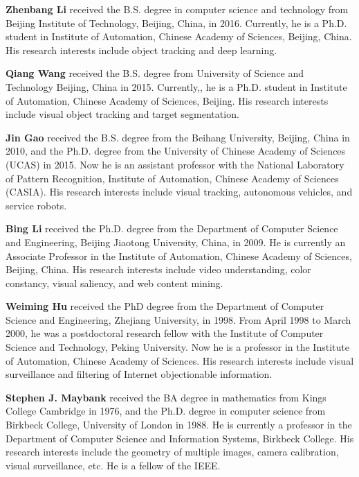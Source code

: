 \documentclass[preprint,10pt]{article}
\date{}
\begin{document}
\noindent \textbf{Zhenbang Li} received the B.S. degree in computer science and technology from Beijing Institute of Technology, Beijing, China, in 2016. Currently, he is a Ph.D. student in Institute of Automation, Chinese Academy of Sciences, Beijing, China. His research interests include object tracking and deep learning.
\vspace{6mm}

\noindent \textbf{Qiang Wang} received the B.S. degree from University of Science and Technology Beijing, China in 2015. Currently,, he is a Ph.D. student in Institute of Automation, Chinese Academy of Sciences, Beijing. His research interests include visual object tracking and target segmentation.
\vspace{6mm}

\noindent \textbf{Jin Gao} received the B.S. degree from the Beihang University, Beijing, China in 2010, and the Ph.D. degree from the University of Chinese Academy of Sciences (UCAS) in 2015. Now he is an assistant professor with the National Laboratory of Pattern Recognition, Institute of Automation, Chinese Academy of Sciences (CASIA). His research interests include visual tracking, autonomous vehicles, and service robots. 
\vspace{6mm}

\noindent \textbf{Bing Li} received the Ph.D. degree from the Department of Computer Science and Engineering, Beijing Jiaotong University, China, in 2009. He is currently an Associate Professor in the Institute of Automation, Chinese Academy of Sciences, Beijing, China. His research interests include video understanding, color constancy, visual saliency, and web content mining.
\vspace{6mm}

\noindent \textbf{Weiming Hu} received the PhD degree from the
Department of Computer Science and Engineering, Zhejiang University, in 1998. From April 1998
to March 2000, he was a postdoctoral research
fellow with the Institute of Computer Science and
Technology, Peking University. Now he is a
professor in the Institute of Automation, Chinese
Academy of Sciences. His research interests
include visual surveillance and filtering of Internet
objectionable information.
\vspace{6mm}

\noindent \textbf{Stephen J. Maybank} received the BA degree in mathematics from Kings College Cambridge in 1976, and the Ph.D. degree in computer science from Birkbeck College, University of London in 1988. He is currently a professor in the Department of Computer Science and Information Systems, Birkbeck College. His research interests include the geometry of multiple images, camera calibration, visual surveillance, etc. He is a fellow of the IEEE.
\vspace{6mm}
\end{document}
